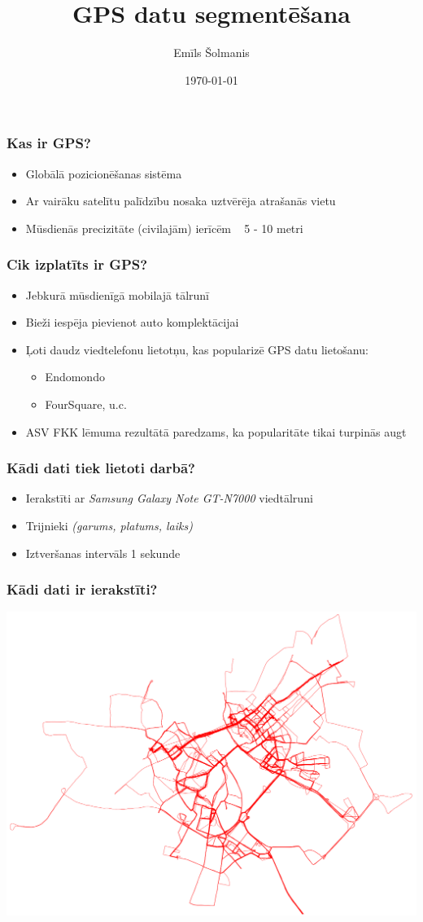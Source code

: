\documentclass[xelatex,mathserif,serif]{beamer}
\author{Emīls Šolmanis}
\title{GPS datu segmentēšana}
\date{\today}
\newlength{\wideitemsep}
\let\olditem\item
\renewcommand{\item}{\setlength{\itemsep}{\wideitemsep}\olditem}
\begin{document}
\frame{\titlepage}

\begin{frame}
  \frametitle{Kas ir GPS?}
  \begin{itemize}
  \item Globālā pozicionēšanas sistēma
  \item Ar vairāku satelītu palīdzību nosaka uztvērēja atrašanās vietu
  \item Mūsdienās precizitāte (civilajām) ierīcēm ~ 5 - 10 metri
  \end{itemize}
\end{frame}

\begin{frame}
  \frametitle{Cik izplatīts ir GPS?}
  \begin{itemize}
  \item Jebkurā mūsdienīgā mobilajā tālrunī
  \item Bieži iespēja pievienot auto komplektācijai
  \item Ļoti daudz viedtelefonu lietotņu, kas popularizē GPS datu lietošanu:
    \begin{itemize}
    \item Endomondo
    \item FourSquare, u.c.
    \end{itemize}
  \item ASV FKK lēmuma rezultātā paredzams, ka popularitāte tikai turpinās augt
  \end{itemize}
\end{frame}

\begin{frame}
  \frametitle{Kādi dati tiek lietoti darbā?}
  \begin{itemize}
  \item Ierakstīti ar \emph{Samsung Galaxy Note GT-N7000} viedtālruni
  \item Trijnieki \emph{(garums, platums, laiks)}
  \item Iztveršanas intervāls 1 sekunde
  \end{itemize}
\end{frame}

\begin{frame}
  \frametitle{Kādi dati ir ierakstīti?}
  \includegraphics[scale=0.3]{img/all_trails}
\end{frame}
\end{document}

